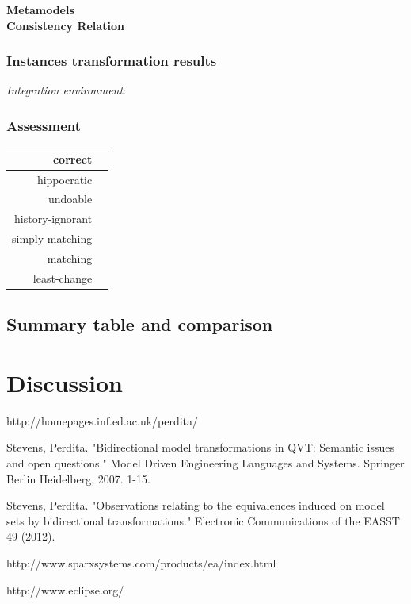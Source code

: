 \documentclass{article}
\begin{document}
\textbf{Metamodels}
~\\

\textbf{Consistency Relation}
\subsubsection{Instances transformation results}
\textit{Integration environment}:
~\\


\subsubsection{Assessment}

\begin{center}
\begin{tabular}{| r | c |}
  \hline                        
  correct & \\
  \hline
  hippocratic & \\
  \hline 
  undoable & \\
  \hline 
  history-ignorant & \\
  \hline 
  simply-matching & \\
  \hline 
  matching & \\
  \hline 
  least-change & \\
  \hline   
\end{tabular}
\end{center}
\pagebreak
\subsection{Summary table and comparison}

\pagebreak
\section{Discussion}

\pagebreak
\begin{thebibliography}{1}

http://homepages.inf.ed.ac.uk/perdita/ 

Stevens, Perdita. "Bidirectional model transformations in QVT: Semantic issues and open questions." Model Driven Engineering Languages and Systems. Springer Berlin Heidelberg, 2007. 1-15.

Stevens, Perdita. "Observations relating to the equivalences induced on model sets by bidirectional transformations." Electronic Communications of the EASST 49 (2012).


http://www.sparxsystems.com/products/ea/index.html

http://www.eclipse.org/


\end{thebibliography}
\end{document}

